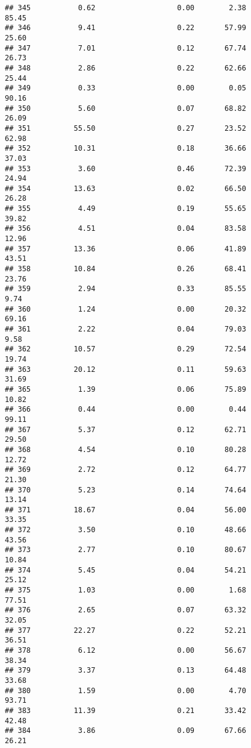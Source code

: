 \documentclass[
]{article}
\begin{document}
\begin{verbatim}
## 345           0.62                   0.00        2.38          85.45
## 346           9.41                   0.22       57.99          25.60
## 347           7.01                   0.12       67.74          26.73
## 348           2.86                   0.22       62.66          25.44
## 349           0.33                   0.00        0.05          90.16
## 350           5.60                   0.07       68.82          26.09
## 351          55.50                   0.27       23.52          62.98
## 352          10.31                   0.18       36.66          37.03
## 353           3.60                   0.46       72.39          24.94
## 354          13.63                   0.02       66.50          26.28
## 355           4.49                   0.19       55.65          39.82
## 356           4.51                   0.04       83.58          12.96
## 357          13.36                   0.06       41.89          43.51
## 358          10.84                   0.26       68.41          23.76
## 359           2.94                   0.33       85.55           9.74
## 360           1.24                   0.00       20.32          69.16
## 361           2.22                   0.04       79.03           9.58
## 362          10.57                   0.29       72.54          19.74
## 363          20.12                   0.11       59.63          31.69
## 365           1.39                   0.06       75.89          10.82
## 366           0.44                   0.00        0.44          99.11
## 367           5.37                   0.12       62.71          29.50
## 368           4.54                   0.10       80.28          12.72
## 369           2.72                   0.12       64.77          21.30
## 370           5.23                   0.14       74.64          13.14
## 371          18.67                   0.04       56.00          33.35
## 372           3.50                   0.10       48.66          43.56
## 373           2.77                   0.10       80.67          10.84
## 374           5.45                   0.04       54.21          25.12
## 375           1.03                   0.00        1.68          77.51
## 376           2.65                   0.07       63.32          32.05
## 377          22.27                   0.22       52.21          36.51
## 378           6.12                   0.00       56.67          38.34
## 379           3.37                   0.13       64.48          33.68
## 380           1.59                   0.00        4.70          93.71
## 383          11.39                   0.21       33.42          42.48
## 384           3.86                   0.09       67.66          26.21

\end{verbatim}
\end{document}

